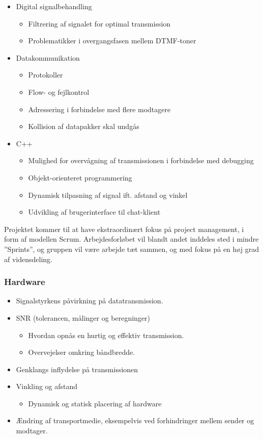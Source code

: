 \begin{itemize}[noitemsep]
  \item Digital signalbehandling
  \begin{itemize}[noitemsep]
    \item Filtrering af signalet for optimal transmission
    \item Problematikker i overgangsfasen mellem DTMF-toner
  \end{itemize}
  \item Datakommunikation
  \begin{itemize}[noitemsep]
    \item Protokoller
    \item Flow- og fejlkontrol
    \item Adressering i forbindelse med flere modtagere
    \item Kollision af datapakker skal undgås
  \end{itemize}
  \item C++
    \begin{itemize}[noitemsep]
    \item Mulighed for overvågning af transmissionen i forbindelse med debugging
    \item Objekt-orienteret programmering
    \item Dynamisk tilpasning af signal ift. afstand og vinkel
    \item Udvikling af brugerinterface til chat-klient
  \end{itemize}
\end{itemize}

Projektet kommer til at have ekstraordinært fokus på project management, i form af modellen Scrum. Arbejdesforløbet vil blandt andet inddeles sted i mindre ”Sprints”, og gruppen vil være arbejde tæt sammen, og med fokus på en høj grad af vidensdeling.

\subsubsection{Hardware}

\begin{itemize}[noitemsep]
  \item Signalstyrkens påvirkning på datatransmission.
  \item SNR (tolerancen, målinger og beregninger)
  \begin{itemize}[noitemsep]
  \item Hvordan opnås en hurtig og effektiv transmission.
  \item Overvejelser omkring båndbredde.
  \end{itemize}
  \item Genklangs inflydelse på transmissionen
  \item Vinkling og afstand
  \begin{itemize}[noitemsep]
  \item Dynamisk og statisk placering af hardware
  \end{itemize}
  \item Ændring af transportmedie, eksempelvis ved forhindringer mellem sender og modtager.
\end{itemize}